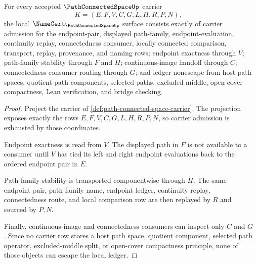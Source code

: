 \begin{theorem}
\label{thm:path-connected-space-namecert-obligations}
For every accepted $\PathConnectedSpaceUp$ carrier
$$
K=(E,F,V,C,G,L,H,R,P,N),
$$
the local $\NameCert_{\PathConnectedSpaceUp}$ surface consists exactly of carrier admission for the endpoint-pair, displayed path-family, endpoint-evaluation, continuity replay, connectedness consumer, locally connected comparison, transport, replay, provenance, and naming rows; endpoint exactness through $V$; path-family stability through $F$ and $H$; continuous-image handoff through $C$; connectedness consumer routing through $G$; and ledger nonescape from host path spaces, quotient path components, selected paths, excluded middle, open-cover compactness, Lean verification, and bridge checking.
\end{theorem}
\begin{proof}
Project the carrier of \autoref{def:path-connected-space-carrier}. The projection exposes exactly the rows $E,F,V,C,G,L,H,R,P,N$, so carrier admission is exhausted by those coordinates.

Endpoint exactness is read from $V$. The displayed path in $F$ is not available to a consumer until $V$ has tied its left and right endpoint evaluations back to the ordered endpoint pair in $E$.

Path-family stability is transported componentwise through $H$. The same endpoint pair, path-family name, endpoint ledger, continuity replay, connectedness route, and local comparison row are then replayed by $R$ and sourced by $P,N$.

Finally, continuous-image and connectedness consumers can inspect only $C$ and $G$. Since no carrier row stores a host path space, quotient component, selected path operator, excluded-middle split, or open-cover compactness principle, none of those objects can escape the local ledger.
\end{proof}


